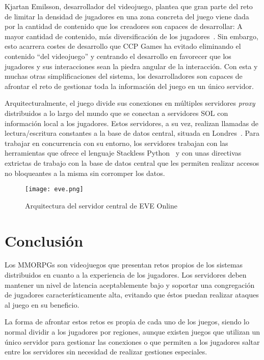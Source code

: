 \documentclass[runningheads]{llncs}
\begin{document}
Kjartan Emilsson, desarrollador del videojuego, plantea que gran parte del reto de limitar la densidad de jugadores en una zona concreta del juego viene dada por la cantidad de contenido que los creadores son capaces de desarrollar: A mayor cantidad de contenido, más diversificación de los jugadores~\cite{inf_space}.
Sin embargo, esto acarrera costes de desarrollo que CCP Games ha evitado eliminando el contenido ``del videojuego'' y centrando el desarrollo en favorecer que los jugadores y sus interacciones sean la piedra angular de la interacción.
Con esta y muchas otras simplificaciones del sistema, los desarrolladores son capaces de afrontar el reto de gestionar toda la información del juego en un único servidor.

Arquitecturalmente, el juego divide sus conexiones en múltiples servidores \textit{proxy} distribuidos a lo largo del mundo que se conectan a servidores SOL con información local a los jugadores.
Estos servidores, a su vez, realizan llamadas de lectura/escritura constantes a la base de datos central, situada en Londres~\cite{eve_server}.
Para trabajar en concurrencia con su entorno, los servidores trabajan con las herramientas que ofrece el lenguaje Stackless Python~\cite{spython} y con unas directivas extrictas de trabajo con la base de datos central que les permiten realizar accesos no bloqueantes a la misma sin corromper los datos.

\begin{figure}[ht!]
	\begin{center}
		\texttt{[image: eve.png]}
	\end{center}
	\caption{Arquitectura del servidor central de EVE Online}
\end{figure}

\pagebreak

\section{Conclusión}

Los MMORPGs son videojuegos que presentan retos propios de los sistemas distribuidos en cuanto a la experiencia de los jugadores.
Los servidores deben mantener un nivel de latencia aceptablemente bajo y soportar una congregación de jugadores característicamente alta, evitando que éstos puedan realizar ataques al juego en su beneficio.

La forma de afrontar estos retos es propia de cada uno de los juegos, siendo lo normal dividir a los jugadores por regiones, aunque existen juegos que utilizan un único servidor para gestionar las conexiones o que permiten a los jugadores saltar entre los servidores sin necesidad de realizar gestiones especiales.
\end{document}
